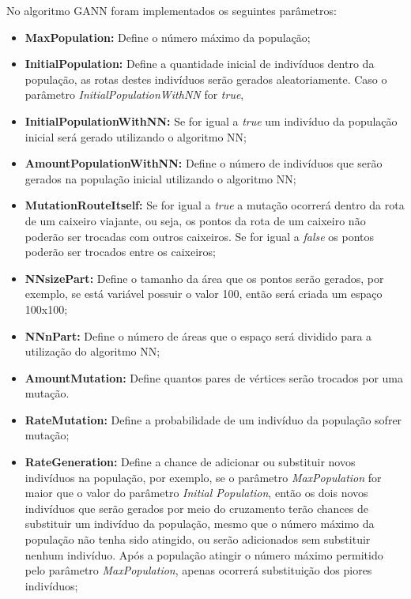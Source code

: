 \documentclass[12pt,openright,a4paper,twoside]{tcc}
\begin{document}
        No algoritmo GANN foram implementados os seguintes parâmetros:
         
            \begin{itemize}
                \item \textbf{MaxPopulation:} Define o número máximo da população; 
                \item \textbf{InitialPopulation:} Define a quantidade inicial de indivíduos dentro da população, as rotas destes indivíduos serão gerados aleatoriamente. Caso o parâmetro \textit{InitialPopulationWithNN} for \textit{true}, 
                \item \textbf{InitialPopulationWithNN:} Se for igual a \textit{true} um indivíduo da população inicial será gerado utilizando o algoritmo NN;
                \item \textbf{AmountPopulationWithNN:} Define o número de indivíduos que serão gerados na população inicial utilizando o algoritmo NN;
                \item \textbf{MutationRouteItself:} Se for igual a \textit{true} a mutação ocorrerá dentro da rota de um caixeiro viajante, ou seja, os pontos da rota de um caixeiro não poderão ser trocadas com outros caixeiros. Se for igual a \textit{false} os pontos poderão ser trocados entre os caixeiros;
                \item \textbf{NNsizePart:} Define o tamanho da área que os pontos serão gerados, por exemplo, se está variável possuir o valor 100, então será criada um espaço 100x100;
                \item \textbf{NNnPart:} Define o número de áreas que o espaço será dividido para a utilização do algoritmo NN;
                \item \textbf{AmountMutation:} Define quantos pares de vértices serão trocados por uma mutação.
                \item \textbf{RateMutation:} Define a probabilidade de um indivíduo da população sofrer mutação;
                \item \textbf{RateGeneration:} Define a chance de adicionar ou substituir novos indivíduos na população, por exemplo, se o parâmetro \textit{MaxPopulation} for maior que o valor do parâmetro \textit{Initial Population}, então os dois novos indivíduos que serão gerados por meio do cruzamento terão chances de substituir um indivíduo da população, mesmo que o número máximo da população não tenha sido atingido, ou serão adicionados sem substituir nenhum indivíduo. Após a população atingir o número máximo permitido pelo parâmetro \textit{MaxPopulation}, apenas ocorrerá substituição dos piores indivíduos;

\end{itemize}
\end{document}

